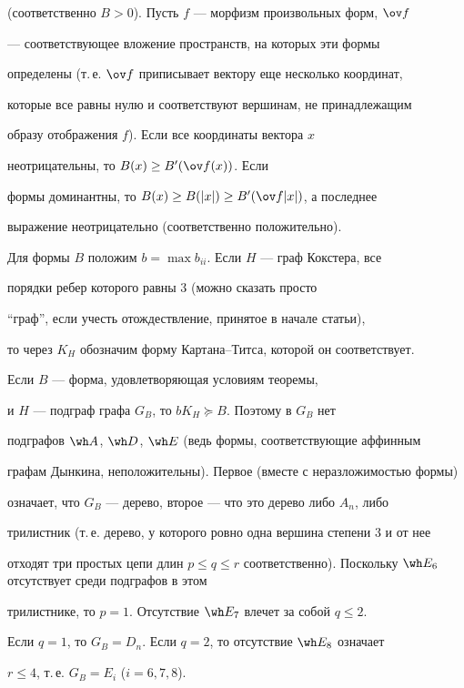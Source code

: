 \begin{pf}
(соответственно $B>0$). Пусть $f$ --- морфизм произвольных форм, $\ov f$ 


--- соответствующее вложение пространств, на которых эти формы 


определены (т.\,е. $\ov f$ приписывает вектору еще несколько координат, 


которые все равны нулю и соответствуют вершинам, не принадлежащим 


образу отображения $f$). Если все координаты вектора $x$ 


неотрицательны, то $B(x)\ge B'(\ov f(x))$. Если 


формы доминантны, то $B(x)\ge B(|x|)\ge B'(\ov f|x|)$, а последнее 


выражение неотрицательно (соответственно положительно). 


 


Для формы $B$ положим $b=\max b_{ii}$. Если $H$ --- граф Кокстера, все 


порядки ребер которого равны 3 (можно сказать просто 


``граф'', если учесть отождествление, принятое в начале статьи), 


то через $K_H$ обозначим форму Картана--Титса, которой он соответствует. 


Если $B$ --- форма, удовлетворяющая условиям теоремы,


и $H$ --- подграф графа $G_B$, то $bK_H\succeq B$. Поэтому в $G_B$ нет 


подграфов $\wh A$, $\wh D$, $\wh E$ (ведь формы, соответствующие аффинным 


графам Дынкина, неположительны). Первое (вместе с неразложимостью формы) 


означает, что $G_B$ --- дерево, второе --- что это дерево либо $A_n$, либо 


трилистник (т.\,е. дерево, у которого ровно одна вершина степени 3 и от нее 


отходят три простых цепи длин $p\le q\le r$ соответственно). Поскольку $\wh 


E_6$ отсутствует среди подграфов в этом 


трилистнике, то $p=1$. Отсутствие $\wh E_7$ влечет за собой $q\le2$. 


Если $q=1$, то $G_B=D_n$. Если $q=2$, то отсутствие $\wh E_8$ означает 


$r\le4$, т.\,е. $G_B=E_i$ ($i=6,7,8$). 


\end{pf} 



